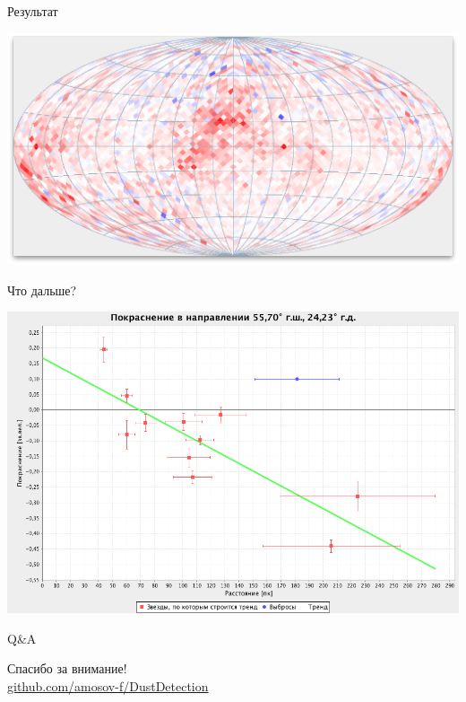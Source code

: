 \documentclass[14pt, fleqn, xcolor={dvipsnames, table}]{beamer}
\begin{document}
        \begin{frame}{Результат}
            \begin{center}
                \includegraphics[scale=0.32]{map-a-white.png}
            \end{center}             
        \end{frame}
        
        \begin{frame}{Что дальше?}
            \begin{center}
                \includegraphics[scale=0.35]{next.png}
            \end{center}             
        \end{frame}    
        
        \begin{frame}{Q\&A}
            \begin{center}
                Спасибо за внимание!\\
                \href{https://github.com/amosov-f/DustDetection}{github.com/amosov-f/DustDetection}
            \end{center}
        \end{frame}
\end{document}
